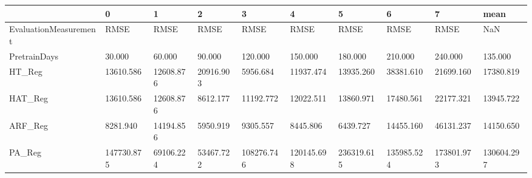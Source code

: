 \begin{tabular}{llllllllll}
\toprule
{} &          0 &         1 &         2 &          3 &          4 &          5 &          6 &          7 &       mean \\
\midrule
EvaluationMeasurement &       RMSE &      RMSE &      RMSE &       RMSE &       RMSE &       RMSE &       RMSE &       RMSE &        NaN \\
PretrainDays          &     30.000 &    60.000 &    90.000 &    120.000 &    150.000 &    180.000 &    210.000 &    240.000 &    135.000 \\
HT\_Reg                &  13610.586 & 12608.876 & 20916.903 &   5956.684 &  11937.474 &  13935.260 &  38381.610 &  21699.160 &  17380.819 \\
HAT\_Reg               &  13610.586 & 12608.876 &  8612.177 &  11192.772 &  12022.511 &  13860.971 &  17480.561 &  22177.321 &  13945.722 \\
ARF\_Reg               &   8281.940 & 14194.856 &  5950.919 &   9305.557 &   8445.806 &   6439.727 &  14455.160 &  46131.237 &  14150.650 \\
PA\_Reg                & 147730.875 & 69106.224 & 53467.722 & 108276.746 & 120145.698 & 236319.615 & 135985.524 & 173801.973 & 130604.297 \\
\bottomrule
\end{tabular}
